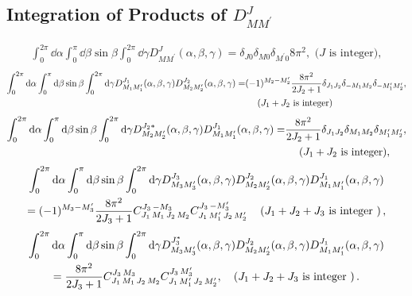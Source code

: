 \subsection{Integration of Products of $D_{M M^{\prime}}^{J}$}\label{sec:4.11.1}
\begin{gather}
\int_{0}^{2 \pi} \dd \alpha \int_{0}^{\pi} \dd \beta \sin \beta \int_{0}^{2 \pi} \dd \gamma D_{M M^{\prime}}^{J}(\alpha, \beta, \gamma)=\delta_{J 0} \delta_{M 0} \delta_{M^{\prime} 0} 8 \pi^{2},\text{ ($J$ is integer)}, \label{eq:4:11:1}
\end{gather}
\begin{align}
\int_{0}^{2 \pi} \mathrm{d} \alpha \int_{0}^{\pi} \mathrm{d} \beta \sin \beta \int_{0}^{2 \pi} \mathrm{d} \gamma D_{M_{1} M_{1}^{\prime}}^{J_{1}}(\alpha, \beta, \gamma) D_{M_{2} M_{2}^{\prime}}^{J_{2}}(\alpha, \beta, \gamma)=&(-1)^{M_{2}-M_{2}^{\prime}} \frac{8 \pi^{2}}{2 J_{2}+1} \delta_{J_{1} J_{2}} \delta_{-M_{1} M_{2}} \delta_{-M_{1}^{\prime} M_{2}^{\prime}} , \notag\\
&\quad\text{ ($J_{1}+J_{2}$ is integer)} \label{eq:4:11:2}
\end{align}
\begin{align}
\int_{0}^{2 \pi} \mathrm{d} \alpha \int_{0}^{\pi} \mathrm{d} \beta \sin \beta \int_{0}^{2 \pi} \mathrm{d} \gamma D_{M_{2} M_{2}^{\prime}}^{J_{2} *}(\alpha, \beta, \gamma) D_{M_{1} M_{1}^{\prime}}^{J_{1}}(\alpha, \beta, \gamma)=&\frac{8 \pi^{2}}{2 J_{2}+1} \delta_{J_{1} J_{2}} \delta_{M_{1} M_{2}} \delta_{M_{1}^{\prime} M_{2}^{\prime}} , \notag\\
&\quad\text{ ($J_{1}+J_{2}$ is integer)}, \label{eq:4:11:3}
\end{align}
\begin{multline}
\int_{0}^{2 \pi} \mathrm{d} \alpha \int_{0}^{\pi} \mathrm{d} \beta \sin \beta \int_{0}^{2 \pi} \mathrm{d} \gamma D_{M_{3} M_{3}^{\prime}}^{J_{3}}(\alpha, \beta, \gamma) D_{M_{2} M_{2}^{\prime}}^{J_{2}}(\alpha, \beta, \gamma) D_{M_{1} M_{1}^{\prime}}^{J_{1}}(\alpha, \beta, \gamma)  \\
=(-1)^{M_{3}-M_{3}^{\prime}} \frac{8 \pi^{2}}{2 J_{3}+1} C_{J_{1}\,M_{1}\,J_{2}\,M_{2}}^{J_{3}\,-M_{3}} C_{J_{1}\,M_{1}^{\prime}\,J_{2}\,M_{2}^{\prime}}^{J_{3}\,-M_{3}^{\prime}}\quad\left(J_{1}+J_{2}+J_{3} \text { is integer }\right), \label{eq:4:11:4}
\end{multline}
\begin{multline}
\int_{0}^{2 \pi} \mathrm{d} \alpha \int_{0}^{\pi} \mathrm{d} \beta \sin \beta \int_{0}^{2 \pi} \mathrm{d} \gamma D_{M_{3} M_{3}^{\prime}}^{J_{3}^{*}}(\alpha, \beta, \gamma) D_{M_{2} M_{2}^{\prime}}^{J_{2}}(\alpha, \beta, \gamma) D_{M_{1} M_{1}^{\prime}}^{J_{1}}(\alpha, \beta, \gamma)  \\
=\frac{8 \pi^{2}}{2 J_{3}+1} C_{J_{1}\,M_{1}\,J_{2}\,M_{2}}^{J_{3}\,M_{3}} C_{J_{1}\,M_{1}^{\prime}\,J_{2}\,M_{2}^{\prime}}^{J_{3}\,M_{3}^{\prime}}, \quad\left(J_{1}+J_{2}+J_{3} \text { is integer }\right). \label{eq:4:11:5}
\end{multline}
